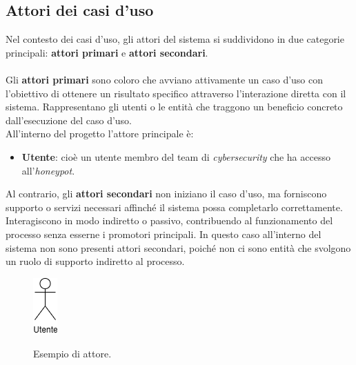 \subsection*{Attori dei casi d'uso}
Nel contesto dei casi d'uso, gli attori del sistema si suddividono in due categorie principali: \textbf{attori primari} e \textbf{attori secondari}.\\\\
Gli \textbf{attori primari} sono coloro che avviano attivamente un caso d'uso con l'obiettivo di ottenere un risultato specifico attraverso l'interazione diretta con il sistema. Rappresentano gli utenti o le entità che traggono un beneficio concreto dall'esecuzione del caso d'uso.\\
All'interno del progetto l'attore principale è:
\begin{itemize}
    \item \textbf{Utente}: cioè un utente membro del team di \textit{cybersecurity} che ha accesso all'\textit{honeypot}.
\end{itemize}
Al contrario, gli \textbf{attori secondari} non iniziano il caso d'uso, ma forniscono supporto o servizi necessari affinché il sistema possa completarlo correttamente. Interagiscono in modo indiretto o passivo, contribuendo al funzionamento del processo senza esserne i promotori principali. In questo caso all'interno del sistema non sono presenti attori secondari, poiché non ci sono entità che svolgono un ruolo di supporto indiretto al processo.\\
\begin{figure}[H]
    \begin{center}
        \includegraphics[alt={Esempio di attore}, width=0.075\columnwidth]{img/attore.png}
        \caption{Esempio di attore.}
        \label{fig:es-attore}
    \end{center}
\end{figure}
